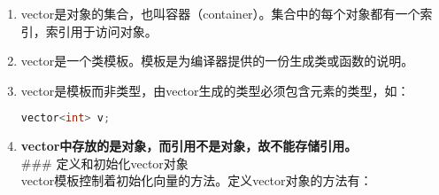 \documentclass[
  a4paper,
  oneside,tablecaptionabove
]{scrbook}
\begin{document}
\begin{enumerate}
\def\labelenumi{\arabic{enumi}.}
\item
  vector是对象的集合，也叫容器（container）。集合中的每个对象都有一个索引，索引用于访问对象。\\
\item
  vector是一个类模板。模板是为编译器提供的一份生成类或函数的说明。\\
\item
  vector是模板而非类型，由vector生成的类型必须包含元素的类型，如：

\begin{lstlisting}[language={C++}]
vector<int> v;
\end{lstlisting}
\item
  \textbf{vector中存放的是对象，而引用不是对象，故不能存储引用。}\\
  \#\#\# 定义和初始化vector对象\\
  vector模板控制着初始化向量的方法。定义vector对象的方法有：\\
\end{enumerate}
\end{document}

